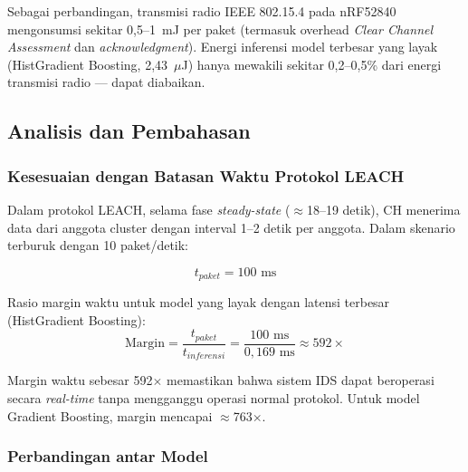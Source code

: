 Sebagai perbandingan, transmisi radio IEEE 802.15.4 pada nRF52840 mengonsumsi sekitar 0,5--1~mJ per paket (termasuk overhead \textit{Clear Channel Assessment} dan \textit{acknowledgment}). Energi inferensi model terbesar yang layak (HistGradient Boosting, 2,43~$\mu$J) hanya mewakili sekitar 0,2--0,5\% dari energi transmisi radio --- dapat diabaikan.

\subsection{Analisis dan Pembahasan}

\subsubsection{Kesesuaian dengan Batasan Waktu Protokol LEACH}

Dalam protokol LEACH, selama fase \textit{steady-state} ($\approx$18--19 detik), CH menerima data dari anggota cluster dengan interval 1--2 detik per anggota. Dalam skenario terburuk dengan 10 paket/detik:

\begin{equation}
    t_{paket} = 100 \text{ ms}
\end{equation}

Rasio margin waktu untuk model yang layak dengan latensi terbesar (HistGradient Boosting):
\begin{equation}
    \text{Margin} = \frac{t_{paket}}{t_{inferensi}} = \frac{100 \text{ ms}}{0{,}169 \text{ ms}} \approx 592\times
\end{equation}

Margin waktu sebesar 592$\times$ memastikan bahwa sistem IDS dapat beroperasi secara \textit{real-time} tanpa mengganggu operasi normal protokol. Untuk model Gradient Boosting, margin mencapai $\approx$763$\times$.

\subsubsection{Perbandingan antar Model}

